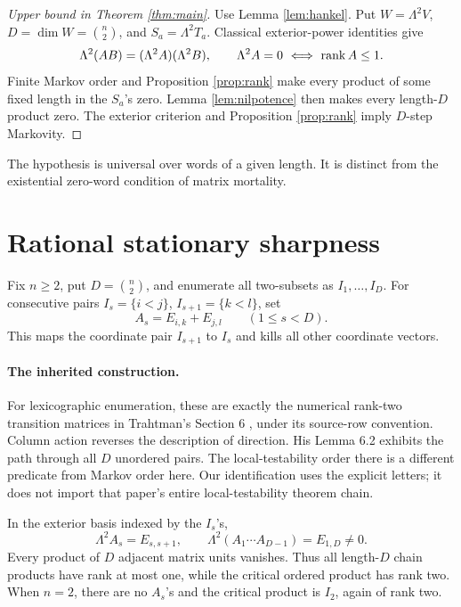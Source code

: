 \begin{proof}[Upper bound in Theorem \ref{thm:main}]
Use Lemma \ref{lem:hankel}. Put \(W=\Lambda^2V\), \(D=\dim W=\binom n2\), and \(S_a=\Lambda^2T_a\). Classical exterior-power identities give
\[
 \Lambda^2(AB)=(\Lambda^2A)(\Lambda^2B),\qquad
 \Lambda^2A=0\ \Longleftrightarrow\ \operatorname{rank} A\le1.
\]
Finite Markov order and Proposition \ref{prop:rank} make every product of some fixed length in the \(S_a\)'s zero. Lemma \ref{lem:nilpotence} then makes every length-\(D\) product zero. The exterior criterion and Proposition \ref{prop:rank} imply \(D\)-step Markovity.
\end{proof}
The hypothesis is universal over words of a given length. It is distinct from the existential zero-word condition of matrix mortality.

\section{Rational stationary sharpness}
Fix \(n\ge2\), put \(D=\binom n2\), and enumerate all two-subsets as \(I_1,\ldots,I_D\). For consecutive pairs \(I_s=\{i<j\}\), \(I_{s+1}=\{k<l\}\), set
\[
 A_s=E_{i,k}+E_{j,l}\qquad(1\le s<D).
\]
This maps the coordinate pair \(I_{s+1}\) to \(I_s\) and kills all other coordinate vectors.

\paragraph{The inherited construction.}
For lexicographic enumeration, these are exactly the numerical rank-two transition matrices in Trahtman's Section 6 \cite{Trahtman1998}, under its source-row convention. Column action reverses the description of direction. His Lemma 6.2 exhibits the path through all \(D\) unordered pairs. The local-testability order there is a different predicate from Markov order here. Our identification uses the explicit letters; it does not import that paper's entire local-testability theorem chain.

In the exterior basis indexed by the \(I_s\)'s,
\[
 \Lambda^2A_s=E_{s,s+1},\qquad
 \Lambda^2(A_1\cdots A_{D-1})=E_{1,D}\ne0.
\]
Every product of \(D\) adjacent matrix units vanishes. Thus all length-\(D\) chain products have rank at most one, while the critical ordered product has rank two. When \(n=2\), there are no \(A_s\)'s and the critical product is \(I_2\), again of rank two.

